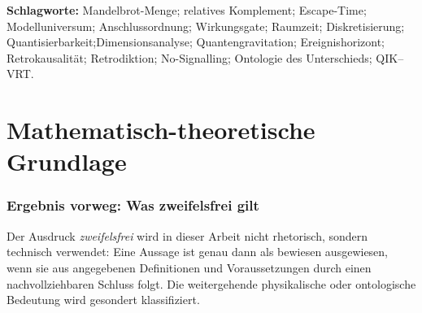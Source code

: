 \documentclass[11pt,a4paper]{article}
\theoremstyle{remark}
\newcommand{\qikvrt}{QIK--VRT}
\begin{document}
\begin{otherlanguage}{english}
\begin{abstract}
Part IV treats retrocausality as a distinct family of physical and
epistemological hypotheses. It separates retrodiction, Bayesian updating,
semantic back-determination, time-reversal symmetry, two-boundary models,
ontic backward influence, operational backward signalling and closed timelike
curves. These notions are tested against advanced and retarded solutions,
pre- and post-selection, weak values, delayed-choice and quantum-eraser
experiments, Bell correlations, the thermodynamic arrow and relativistic
causal order. A theorem establishes that the autonomous Mandelbrot/QIK--VRT
process defined here contains no backward state channel. Physical
retrocausality therefore remains a precise additional hypothesis rather than
a consequence proved by the present mathematics. Part V collects the
resulting falsification criteria, ontology, public evidence, research
programme and ethical consequences.
\end{abstract}
\end{otherlanguage}

\textbf{Schlagworte:} Mandelbrot-Menge; relatives Komplement; Escape-Time;
Modelluniversum; Anschlussordnung; Wirkungsgate; Raumzeit; Diskretisierung;
Quantisierbarkeit;\linebreak Dimensionsanalyse; Quantengravitation; Ereignishorizont;
Retrokausalität; Retrodiktion; No-Signalling; Ontologie des Unterschieds;
\qikvrt.

\tableofcontents
\newpage

\part{Mathematisch-theoretische Grundlage}

\section{Ergebnis vorweg: Was zweifelsfrei gilt}

Der Ausdruck \emph{zweifelsfrei} wird in dieser Arbeit nicht rhetorisch,
sondern technisch verwendet: Eine Aussage ist genau dann als bewiesen
ausgewiesen, wenn sie aus angegebenen Definitionen und Voraussetzungen durch
einen nachvollziehbaren Schluss folgt. Die weitergehende physikalische oder
ontologische Bedeutung wird gesondert klassifiziert.
\end{document}
